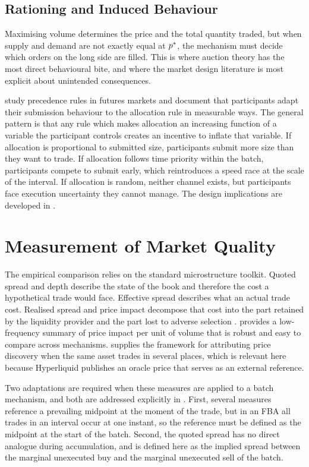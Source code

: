 \subsection{Rationing and Induced Behaviour}

Maximising volume determines the price and the total quantity traded,
but when supply and demand are not exactly equal at $p^{\ast}$, the
mechanism must decide which orders on the long side are filled. This
is where auction theory has the most direct behavioural bite, and where
the market design literature is most explicit about unintended
consequences.

\citet{haynes2020precedence} study precedence rules in futures markets
and document that participants adapt their submission behaviour to the
allocation rule in measurable ways. The general pattern is that any rule
which makes allocation an increasing function of a variable the
participant controls creates an incentive to inflate that variable. If
allocation is proportional to submitted size, participants submit more
size than they want to trade. If allocation follows time priority within
the batch, participants compete to submit early, which reintroduces a
speed race at the scale of the interval. If allocation is random,
neither channel exists, but participants face execution uncertainty they
cannot manage. The design implications are developed in
.

\section{Measurement of Market Quality}
\label{sec:quality}

The empirical comparison relies on the standard microstructure toolkit.
Quoted spread and depth describe the state of the book and therefore the
cost a hypothetical trade would face. Effective spread describes what an
actual trade cost. Realised spread and price impact decompose that cost
into the part retained by the liquidity provider and the part lost to
adverse selection \citep{hasbrouck1993assessing}. \citet{amihud2002illiquidity}
provides a low-frequency summary of price impact per unit of volume that
is robust and easy to compare across mechanisms.
\citet{hasbrouck1995onesecurity} supplies the framework for attributing
price discovery when the same asset trades in several places, which is
relevant here because Hyperliquid publishes an oracle price that serves
as an external reference.

Two adaptations are required when these measures are applied to a batch
mechanism, and both are addressed explicitly in .
First, several measures reference a prevailing midpoint at the moment of
the trade, but in an FBA all trades in an interval occur at one instant,
so the reference must be defined as the midpoint at the start of the
batch. Second, the quoted spread has no direct analogue during
accumulation, and is defined here as the implied spread between the
marginal unexecuted buy and the marginal unexecuted sell of the batch.

